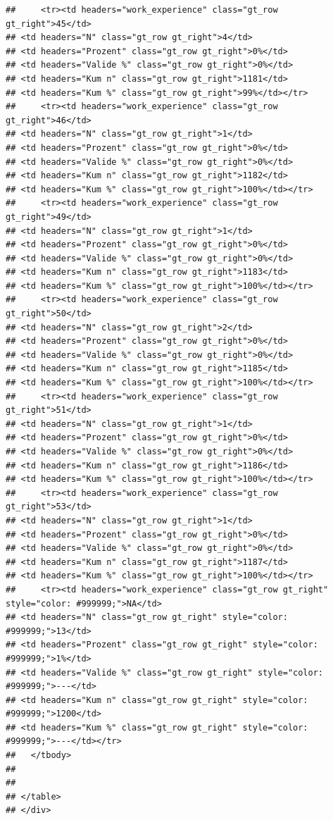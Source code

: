 \documentclass[
  a4paper,
  DIV=11,
  numbers=noendperiod]{scrartcl}
\begin{document}
\begin{verbatim}
##     <tr><td headers="work_experience" class="gt_row gt_right">45</td>
## <td headers="N" class="gt_row gt_right">4</td>
## <td headers="Prozent" class="gt_row gt_right">0%</td>
## <td headers="Valide %" class="gt_row gt_right">0%</td>
## <td headers="Kum n" class="gt_row gt_right">1181</td>
## <td headers="Kum %" class="gt_row gt_right">99%</td></tr>
##     <tr><td headers="work_experience" class="gt_row gt_right">46</td>
## <td headers="N" class="gt_row gt_right">1</td>
## <td headers="Prozent" class="gt_row gt_right">0%</td>
## <td headers="Valide %" class="gt_row gt_right">0%</td>
## <td headers="Kum n" class="gt_row gt_right">1182</td>
## <td headers="Kum %" class="gt_row gt_right">100%</td></tr>
##     <tr><td headers="work_experience" class="gt_row gt_right">49</td>
## <td headers="N" class="gt_row gt_right">1</td>
## <td headers="Prozent" class="gt_row gt_right">0%</td>
## <td headers="Valide %" class="gt_row gt_right">0%</td>
## <td headers="Kum n" class="gt_row gt_right">1183</td>
## <td headers="Kum %" class="gt_row gt_right">100%</td></tr>
##     <tr><td headers="work_experience" class="gt_row gt_right">50</td>
## <td headers="N" class="gt_row gt_right">2</td>
## <td headers="Prozent" class="gt_row gt_right">0%</td>
## <td headers="Valide %" class="gt_row gt_right">0%</td>
## <td headers="Kum n" class="gt_row gt_right">1185</td>
## <td headers="Kum %" class="gt_row gt_right">100%</td></tr>
##     <tr><td headers="work_experience" class="gt_row gt_right">51</td>
## <td headers="N" class="gt_row gt_right">1</td>
## <td headers="Prozent" class="gt_row gt_right">0%</td>
## <td headers="Valide %" class="gt_row gt_right">0%</td>
## <td headers="Kum n" class="gt_row gt_right">1186</td>
## <td headers="Kum %" class="gt_row gt_right">100%</td></tr>
##     <tr><td headers="work_experience" class="gt_row gt_right">53</td>
## <td headers="N" class="gt_row gt_right">1</td>
## <td headers="Prozent" class="gt_row gt_right">0%</td>
## <td headers="Valide %" class="gt_row gt_right">0%</td>
## <td headers="Kum n" class="gt_row gt_right">1187</td>
## <td headers="Kum %" class="gt_row gt_right">100%</td></tr>
##     <tr><td headers="work_experience" class="gt_row gt_right" style="color: #999999;">NA</td>
## <td headers="N" class="gt_row gt_right" style="color: #999999;">13</td>
## <td headers="Prozent" class="gt_row gt_right" style="color: #999999;">1%</td>
## <td headers="Valide %" class="gt_row gt_right" style="color: #999999;">---</td>
## <td headers="Kum n" class="gt_row gt_right" style="color: #999999;">1200</td>
## <td headers="Kum %" class="gt_row gt_right" style="color: #999999;">---</td></tr>
##   </tbody>
##   
##   
## </table>
## </div>
\end{verbatim}
\end{document}
